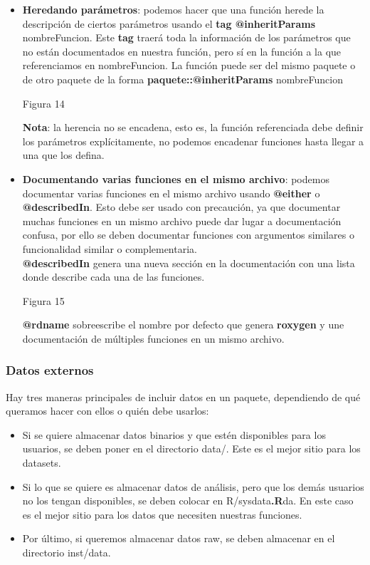 \begin{itemize}
    \item \textbf{Heredando par\'ametros}: podemos hacer que una funci\'on herede la descripci\'on de
ciertos par\'ametros usando el \textbf{tag @inheritParams} nombreFuncion. Este \textbf{tag} traer\'a
toda la informaci\'on de los par\'ametros que no est\'an documentados en nuestra funci\'on,
pero s\'i en la funci\'on a la que referenciamos en nombreFuncion.
La funci\'on puede ser del mismo paquete o de otro paquete de la forma
\textbf{paquete::@inheritParams} nombreFuncion

Figura 14

\textbf{Nota}: la herencia no se encadena, esto es, la funci\'on referenciada debe definir los
par\'ametros expl\'icitamente, no podemos encadenar funciones hasta llegar a una que
los defina.
    \item \textbf{Documentando varias funciones en el mismo archivo}: podemos documentar
varias funciones en el mismo archivo usando \textbf{@either} o \textbf{@describedIn}. Esto debe ser
usado con precauci\'on, ya que documentar muchas funciones en un mismo archivo
puede dar lugar a documentaci\'on confusa, por ello se deben documentar funciones
con argumentos similares o funcionalidad similar o complementaria.\\
\textbf{@describedIn} genera una nueva secci\'on en la documentaci\'on con una lista donde
describe cada una de las funciones.

Figura 15

\textbf{@rdname} sobreescribe el nombre por defecto que genera \textbf{roxygen} y une
documentaci\'on de m\'ultiples funciones en un mismo archivo.
\end{itemize}

\subsubsection{Datos externos}

Hay tres maneras principales de incluir datos en un paquete, dependiendo de qu\'e queramos
hacer con ellos o qui\'en debe usarlos:

\begin{itemize}
    \item Si se quiere almacenar datos binarios y que est\'en disponibles para los usuarios, se
deben poner en el directorio data/. Este es el mejor sitio para los datasets.
    \item Si lo que se quiere es almacenar datos de an\'alisis, pero que los dem\'as usuarios no
los tengan disponibles, se deben colocar en R/sysdata\textbf{.R}da. En este caso es el mejor
sitio para los datos que necesiten nuestras funciones.
    \item Por \'ultimo, si queremos almacenar datos raw, se deben almacenar en el directorio
inst/data.
\end{itemize}

